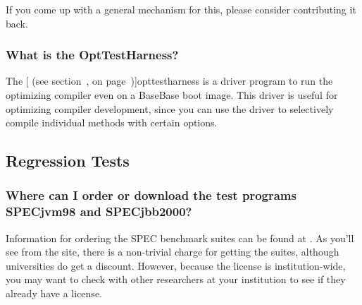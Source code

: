 If you come up with a general mechanism for this, please consider
contributing it back.

\subsubsection{What is the OptTestHarness?}

The [ (see section~\Ref, on page~\Pageref)]{opttestharness} is a driver
program to run the optimizing compiler even on a BaseBase boot image.
This driver is useful for optimizing compiler development, since you
can use the driver to selectively compile individual methods with
certain options.

\subsection{Regression Tests}

\subsubsection{Where can I order or download the test programs 
  SPECjvm\Rheadingweb{}98 and SPECjbb\Rheadingweb{}2000?}

Information for ordering the SPEC\Rweb{} benchmark suites can be found at
.
As you'll see from the site, there is a non-trivial charge for getting the
suites, although universities do get a discount.
However, because the license is institution-wide, you may want to check with
other researchers at your institution to see if they already have a license.

